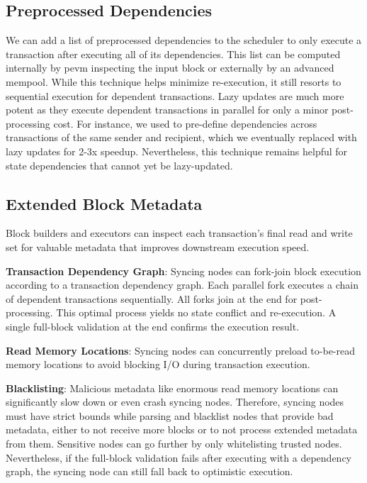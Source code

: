 \documentclass{article}
\begin{document}
\subsection{Preprocessed Dependencies}

We can add a list of preprocessed dependencies to the scheduler to only execute a transaction after executing all of
its dependencies. This list can be computed internally by pevm inspecting the input block or externally by an advanced
mempool. While this technique helps minimize re-execution, it still resorts to sequential execution for dependent
transactions. Lazy updates are much more potent as they execute dependent transactions in parallel for only a minor
post-processing cost. For instance, we used to pre-define dependencies across transactions of the same sender and
recipient, which we eventually replaced with lazy updates for 2-3x speedup. Nevertheless, this technique remains
helpful for state dependencies that cannot yet be lazy-updated.

\subsection{Extended Block Metadata}

Block builders and executors can inspect each transaction's final read and write set for valuable metadata that
improves downstream execution speed.

\textbf{Transaction Dependency Graph}: Syncing nodes can fork-join block execution according to a transaction
dependency graph. Each parallel fork executes a chain of dependent transactions sequentially. All forks join at the end
for post-processing. This optimal process yields no state conflict and re-execution. A single full-block validation at
the end confirms the execution result.

\textbf{Read Memory Locations}: Syncing nodes can concurrently preload to-be-read memory locations to avoid blocking
I/O during transaction execution.

\textbf{Blacklisting}: Malicious metadata like enormous read memory locations can significantly slow down or even crash
syncing nodes. Therefore, syncing nodes must have strict bounds while parsing and blacklist nodes that provide bad
metadata, either to not receive more blocks or to not process extended metadata from them. Sensitive nodes can go
further by only whitelisting trusted nodes. Nevertheless, if the full-block validation fails after executing with a
dependency graph, the syncing node can still fall back to optimistic execution.
\end{document}
